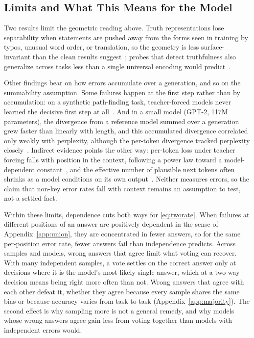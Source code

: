 \documentclass{ieeeaccess}
\begin{document}
\subsection{Limits and What This Means for the Model}
Two results limit the geometric reading above. Truth representations lose separability when statements are pushed away from the forms seen in training by typos, unusual word order, or translation, so the geometry is less surface-invariant than the clean results suggest~\cite{haller2025brittle}; probes that detect truthfulness also generalize across tasks less than a single universal encoding would predict~\cite{orgad2025know}.

Other findings bear on how errors accumulate over a generation, and so on the summability assumption. Some failures happen at the first step rather than by accumulation: on a synthetic path-finding task, teacher-forced models never learned the decisive first step at all~\cite{bachmann2024pitfalls}. And in a small model (GPT-2, 117M parameters), the divergence from a reference model summed over a generation grew faster than linearly with length, and this accumulated divergence correlated only weakly with perplexity, although the per-token divergence tracked perplexity closely~\cite{arora2022exposure}. Indirect evidence points the other way: per-token loss under teacher forcing falls with position in the context, following a power law toward a model-dependent constant~\cite{kaplan2020scaling}, and the effective number of plausible next tokens often shrinks as a model conditions on its own output~\cite{yang2025horizon}. Neither measures errors, so the claim that non-key error rates fall with context remains an assumption to test, not a settled fact.

Within these limits, dependence cuts both ways for \eqref{eq:tworate}. When failures at different positions of an answer are positively dependent in the sense of Appendix~\ref{app:union}, they are concentrated in fewer answers, so for the same per-position error rate, fewer answers fail than independence predicts. Across samples and models, wrong answers that agree limit what voting can recover. With many independent samples, a vote settles on the correct answer only at decisions where it is the model's most likely single answer, which at a two-way decision means being right more often than not. Wrong answers that agree with each other defeat it, whether they agree because every sample shares the same bias or because accuracy varies from task to task (Appendix~\ref{app:majority}). The second effect is why sampling more is not a general remedy, and why models whose wrong answers agree gain less from voting together than models with independent errors would.
\end{document}
